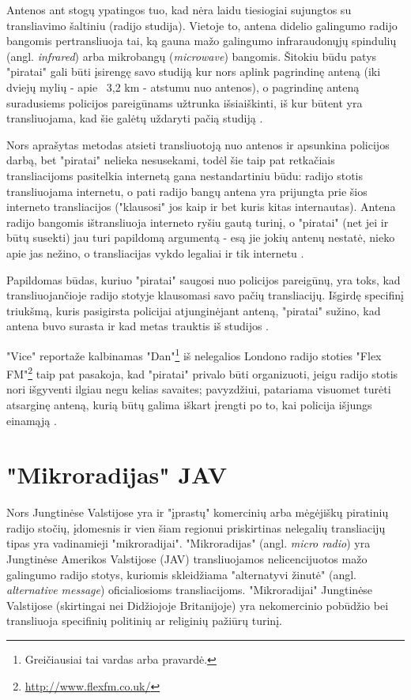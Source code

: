 \documentclass[kursinis-darbas]{vukf}
\begin{document}
Antenos ant stogų ypatingos tuo, kad nėra laidu tiesiogiai sujungtos su transliavimo šaltiniu (radijo studija). Vietoje to, antena didelio galingumo radijo bangomis pertransliuoja tai, ką gauna mažo galingumo infraraudonųjų spindulių (angl. \emph{infrared}) arba mikrobangų (\emph{microwave}) bangomis. Šitokiu būdu patys "piratai" gali būti įsirengę savo studiją kur nors aplink pagrindinę anteną (iki dviejų mylių - apie ~3,2 km - atstumu nuo antenos), o pagrindinę anteną suradusiems policijos pareigūnams užtrunka išsiaiškinti, iš kur būtent yra transliuojama, kad šie galėtų uždaryti pačią studiją \cite{vice_london_pirate_sequences}.

Nors aprašytas metodas atsieti transliuotoją nuo antenos ir apsunkina policijos darbą, bet "piratai" nelieka nesusekami, todėl šie taip pat retkačiais transliacijoms pasitelkia internetą gana nestandartiniu būdu: radijo stotis transliuojama internetu, o pati radijo bangų antena yra prijungta prie šios interneto transliacijos ("klausosi" jos kaip ir bet kuris kitas internautas). Antena radijo bangomis ištransliuoja interneto ryšiu gautą turinį, o "piratai" (net jei ir būtų susekti) jau turi papildomą argumentą - esą jie jokių antenų nestatė, nieko apie jas nežino, o transliacijas vykdo legaliai ir tik internetu \cite{new_scientist_how_airwave_pirates_are_going_online}.

Papildomas būdas, kuriuo "piratai" saugosi nuo policijos pareigūnų, yra toks, kad transliuojančioje radijo stotyje klausomasi savo pačių transliacijų. Išgirdę specifinį triukšmą, kuris pasigirsta policijai atjunginėjant anteną, "piratai" sužino, kad antena buvo surasta ir kad metas trauktis iš studijos \cite{vice_london_pirate_sequences}.

"Vice" reportaže kalbinamas "Dan"\footnote{Greičiausiai tai vardas arba pravardė.} iš nelegalios Londono radijo stoties "Flex FM"\footnote{\url{http://www.flexfm.co.uk/}} taip pat pasakoja, kad "piratai" privalo būti organizuoti, jeigu radijo stotis nori išgyventi ilgiau negu kelias savaites; pavyzdžiui, patariama visuomet turėti atsarginę anteną, kurią būtų galima iškart įrengti po to, kai policija išjungs einamąją \cite{vice_london_pirate_sequences}.


\section{"Mikroradijas" JAV}

Nors Jungtinėse Valstijose yra ir "įprastų" komercinių arba mėgėjiškų piratinių radijo stočių, įdomesnis ir vien šiam regionui priskirtinas nelegalių transliacijų tipas yra vadinamieji "mikroradijai". "Mikroradijas" (angl. \emph{micro radio}) yra Jungtinėse Amerikos Valstijose (JAV) transliuojamos nelicencijuotos mažo galingumo radijo stotys, kuriomis skleidžiama "alternatyvi žinutė" (angl. \emph{alternative message}) \cite[p.~134]{hc_key_concepts_in_radio_studies} oficialiosioms transliacijoms. "Mikroradijai" Jungtinėse Valstijose (skirtingai nei Didžiojoje Britanijoje) yra nekomercinio pobūdžio bei transliuoja specifinių politinių ar religinių pažiūrų turinį.
\end{document}
